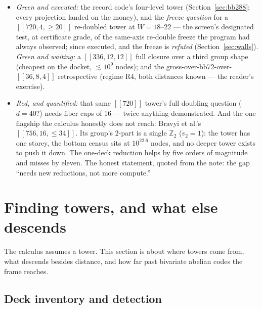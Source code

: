 \documentclass[11pt]{article}
\theoremstyle{plain}
\theoremstyle{definition}
\theoremstyle{remark}
\newcommand{\Z}{\mathbb{Z}}
\begin{document}
\begin{itemize}[leftmargin=2em]
\item \emph{Green and executed:} the record code's four-level tower
  (Section~\ref{sec:bb288}; every projection landed on the money), and
  the \emph{freeze question} for a $[[720,4,{\geq}20]]$ re-doubled tower
  at $W = 18$--$22$ --- the screen's designated test, at certificate
  grade, of the same-axis re-double freeze the program had always
  observed; since executed, and the freeze is \emph{refuted}
  (Section~\ref{sec:walls}). \emph{Green and waiting:} a $[[336,12,12]]$
  full closure over a third group shape (cheapest on the docket,
  ${\lesssim}10^9$ nodes); and the gross-over-bb72-over-$[[36,8,4]]$
  retrospective (regime R4, both distances known --- the reader's
  exercise).
\item \emph{Red, and quantified:} that same $[[720]]$ tower's full
  doubling question ($d = 40$?) needs fiber caps of 16 --- twice
  anything demonstrated. And the one flagship the calculus honestly does
  not reach: Bravyi et al.'s $[[756,16,\leq 34]]$. Its group's
  $2$-part is a single $\Z_2$ ($v_2 = 1$): the tower has one storey, the
  bottom census sits at $10^{22.6}$ nodes, and no deeper tower exists to
  push it down. The one-deck reduction helps by five orders of magnitude
  and misses by eleven. The honest statement, quoted from the note:
  the gap ``needs new reductions, not more compute.''
\end{itemize}

\section{Finding towers, and what else descends}
\label{sec:finding}

The calculus assumes a tower. This section is about where towers come
from, what descends besides distance, and how far past bivariate abelian
codes the frame reaches.

\subsection{Deck inventory and detection}
\end{document}
